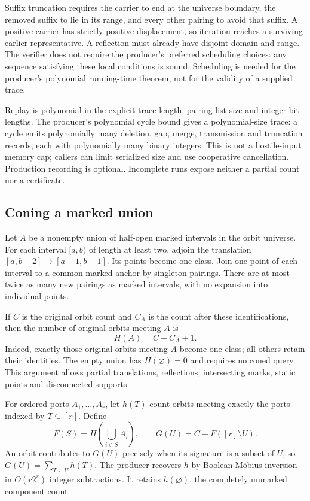 Suffix truncation requires the carrier to end at the universe boundary,
the removed suffix to lie in its range, and every other pairing to avoid
that suffix. A positive carrier has strictly positive displacement, so
iteration reaches a surviving earlier representative. A reflection must
already have disjoint domain and range. The verifier does not require the
producer's preferred scheduling choices: any sequence satisfying these
local conditions is sound. Scheduling is needed for the producer's
polynomial running-time theorem, not for the validity of a supplied trace.

Replay is polynomial in the explicit trace length, pairing-list size and
integer bit lengths. The producer's polynomial cycle bound gives a
polynomial-size trace: a cycle emits polynomially many deletion, gap, merge,
transmission and truncation records, each with polynomially many binary
integers. This is not a hostile-input memory cap; callers can limit
serialized size and use cooperative cancellation. Production recording is
optional. Incomplete runs expose neither a partial count nor a certificate.

\subsection{Coning a marked union}

Let $A$ be a nonempty union of half-open marked intervals in the orbit
universe. For each interval $[a,b)$ of length at least two, adjoin the
translation $[a,b-2]\to[a+1,b-1]$. Its points become one class. Join one
point of each interval to a common marked anchor by singleton pairings.
There are at most twice as many new pairings as marked intervals, with no
expansion into individual points.

If $C$ is the original orbit count and $C_A$ is the count after these
identifications, then the number of original orbits meeting $A$ is
\[
 H(A)=C-C_A+1.
\]
Indeed, exactly those original orbits meeting $A$ become one class; all
others retain their identities. The empty union has $H(\varnothing)=0$
and requires no coned query. This argument allows partial translations,
reflections, intersecting marks, static points and disconnected supports.

For ordered ports $A_1,\ldots,A_r$, let $h(T)$ count orbits meeting exactly
the ports indexed by $T\subseteq[r]$. Define
\[
 F(S)=H\!\left(\bigcup_{i\in S}A_i\right),\qquad
 G(U)=C-F([r]\setminus U).
\]
An orbit contributes to $G(U)$ precisely when its signature is a subset
of $U$, so $G(U)=\sum_{T\subseteq U}h(T)$. The producer recovers $h$ by
Boolean M\"obius inversion in $O(r2^r)$ integer subtractions. It retains
$h(\varnothing)$, the completely unmarked component count.

